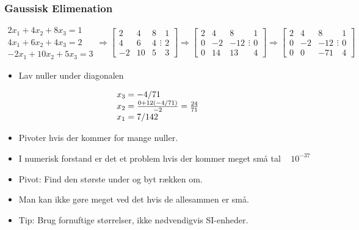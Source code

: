 \documentclass[a4wide,10pt]{article}
\begin{document}
\subsubsection{Gaussisk Elimenation} %
\label{ssub:gaussisk_elimenation}
\[\begin{array}{*{20}{c}}
{2{x_1} + 4{x_2} + 8{x_3} = 1}\\
{4{x_1} + 6{x_2} + 4{x_3} = 2}\\
{ - 2{x_1} + 10{x_2} + 5{x_3} = 3}
\end{array} \Rightarrow \left[ {\begin{array}{*{20}{c}}
2&4&8\\
4&6&4\\
{ - 2}&{10}&5
\end{array} \vdots \begin{array}{*{20}{c}}
1\\
2\\
3
\end{array}} \right] \Rightarrow \left[ {\begin{array}{*{20}{c}}
2&4&8\\
0&{ - 2}&{ - 12}\\
0&{14}&{13}
\end{array} \vdots \begin{array}{*{20}{c}}
1\\
0\\
4
\end{array}} \right] \Rightarrow \left[ {\begin{array}{*{20}{c}}
2&4&8\\
0&{ - 2}&{ - 12}\\
0&0&{ - 71}
\end{array} \vdots \begin{array}{*{20}{c}}
1\\
0\\
4
\end{array}} \right]\]
\begin{itemize}
	\item Lav nuller under diagonalen
\end{itemize}
\[\begin{array}{l}
{x_3} =  - {4 \mathord{\left/
 {\vphantom {4 {71}}} \right.
 \kern-\nulldelimiterspace} {71}}\\
{x_2} = \frac{{0 + 12( - {4 \mathord{\left/
 {\vphantom {4 {71}}} \right.
 \kern-\nulldelimiterspace} {71}})}}{{ - 2}} = \frac{{24}}{{71}}\\
{x_1} = {7 \mathord{\left/
 {\vphantom {7 {142}}} \right.
 \kern-\nulldelimiterspace} {142}}
\end{array}\]
\begin{itemize}
	\item Pivoter hvis der kommer for mange nuller.
	\item I numerisk forstand er det et problem hvis der kommer meget små tal ~ $10^{-37}$
	\item Pivot: Find den største under og byt rækken om.
	\item Man kan ikke gøre meget ved det hvis de allesammen er små.
	\item Tip: Brug fornuftige størrelser, ikke nødvendigvis SI-enheder.
\end{itemize}


\end{document}
